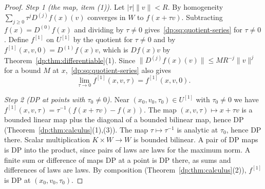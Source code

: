 \documentclass[11pt]{amsart}
\theoremstyle{definition}
\theoremstyle{remark}
\numberwithin{equation}{section}
\newcommand{\abs}[1]{\lvert #1\rvert}
\newcommand{\norm}[1]{\lVert #1\rVert}
\theoremstyle{plain}
\theoremstyle{definition}
\theoremstyle{plain}
\begin{document}
\begin{proof}
\emph{Step 1 (the map, item (1)).} Let $\abs\tau\norm v<R$. By homogeneity $\sum_{j\ge0}\tau^jD^{(j)}f(x)(v)$ converges in $W$ to $f(x+\tau v)$. Subtracting $f(x)=D^{(0)}f(x)$ and dividing by $\tau\ne0$ gives~\eqref{dp:sq:quotient-series} for $\tau\ne0$. Define $f^{[1]}$ on $U^{[1]}$ by the quotient for $\tau\ne0$ and by $f^{[1]}(x,v,0)=D^{(1)}f(x)v$, which is $Df(x)v$ by Theorem~\ref{dp:thm:differentiable}(1). Since $\norm{D^{(j)}f(x)(v)}\le MR^{-j}\norm v^j$ for a bound $M$ at $x$,~\eqref{dp:sq:quotient-series} also gives
\begin{equation}\label{dp:sq:limit}
 \lim_{\tau\to0}f^{[1]}(x,v,\tau)=f^{[1]}(x,v,0).
\end{equation}

\emph{Step 2 (DP at points with $\tau_0\ne0$).} Near $(x_0,v_0,\tau_0)\in U^{[1]}$ with $\tau_0\ne0$ we have $f^{[1]}(x,v,\tau)=\tau^{-1}(f(x+\tau v)-f(x))$. The map $(x,v,\tau)\mapsto x+\tau v$ is a bounded linear map plus the diagonal of a bounded bilinear map, hence DP (Theorem~\ref{dp:thm:calculus}(1),(3)). The map $\tau\mapsto\tau^{-1}$ is analytic at $\tau_0$, hence DP there. Scalar multiplication $K\times W\to W$ is bounded bilinear. A pair of DP maps is DP into the product, since pairs of laws are laws for the maximum norm. A finite sum or difference of maps DP at a point is DP there, as sums and differences of laws are laws. By composition (Theorem~\ref{dp:thm:calculus}(2)), $f^{[1]}$ is DP at $(x_0,v_0,\tau_0)$.


\end{proof}
\end{document}
